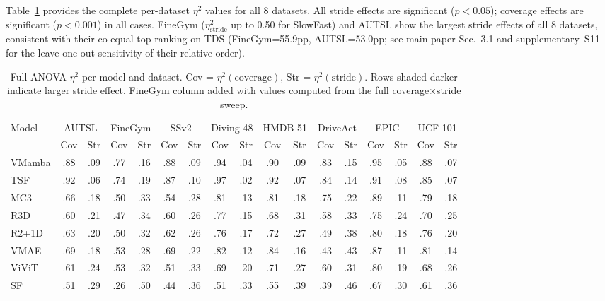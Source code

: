\documentclass[runningheads]{llncs}
\newcommand{\tabtight}{\setlength{\tabcolsep}{3.5pt}\renewcommand{\arraystretch}{1.12}}
\begin{document}
Table~\ref{tab:anova_full} provides the complete per-dataset $\eta^2$ values for all 8 datasets. All stride effects are significant ($p < 0.05$); coverage effects are significant ($p < 0.001$) in all cases. FineGym ($\eta^2_\text{stride}$ up to 0.50 for SlowFast) and AUTSL show the largest stride effects of all 8 datasets, consistent with their co-equal top ranking on TDS (FineGym=55.9pp, AUTSL=53.0pp; see main paper Sec.~3.1 and supplementary~S11 for the leave-one-out sensitivity of their relative order).

\begin{table}[!htbp]
\centering
\caption{Full ANOVA $\eta^2$ per model and dataset. Cov = $\eta^2(\text{coverage})$, Str = $\eta^2(\text{stride})$. Rows shaded darker indicate larger stride effect. FineGym column added with values computed from the full coverage$\times$stride sweep.}
\label{tab:anova_full}
\scriptsize\tabtight
\begin{adjustbox}{max width=\textwidth}
\begin{tabular}{l *{8}{cc}}
\toprule
\multirow{2}{*}{Model} & \multicolumn{2}{c}{AUTSL} & \multicolumn{2}{c}{FineGym} & \multicolumn{2}{c}{SSv2} & \multicolumn{2}{c}{Diving-48} & \multicolumn{2}{c}{HMDB-51} & \multicolumn{2}{c}{DriveAct} & \multicolumn{2}{c}{EPIC}
 & \multicolumn{2}{c}{UCF-101} \\
\cmidrule(lr){2-3}\cmidrule(lr){4-5}\cmidrule(lr){6-7}\cmidrule(lr){8-9} \cmidrule(lr){10-11}\cmidrule(lr){12-13}\cmidrule(lr){14-15}\cmidrule(lr){16-17} & Cov & Str & Cov & Str & Cov & Str & Cov & Str & Cov & Str & Cov & Str & Cov & Str
 & Cov & Str \\
\midrule
VMamba & .88 & .09 & .77 & .16 & .88 & .09 & .94 & .04 & .90 & .09 & .83 & .15 & .95 & .05 & .88 & .07 \\
TSF    & .92 & .06 & .74 & .19 & .87 & .10 & .97 & .02 & .92 & .07 & .84 & .14 & .91 & .08 & .85 & .07 \\
MC3    & .66 & .18 & .50 & .33 & .54 & .28 & .81 & .13 & .81 & .18 & .75 & .22 & .89 & .11 & .79 & .18 \\
R3D    & .60 & .21 & .47 & .34 & .60 & .26 & .77 & .15 & .68 & .31 & .58 & .33 & .75 & .24 & .70 & .25 \\
R2+1D  & .63 & .20 & .50 & .32 & .62 & .26 & .76 & .17 & .72 & .27 & .49 & .38 & .80 & .18 & .76 & .20 \\
VMAE   & .69 & .18 & .53 & .28 & .69 & .22 & .82 & .12 & .84 & .16 & .43 & .43 & .87 & .11 & .81 & .14 \\
ViViT  & .61 & .24 & .53 & .32 & .51 & .33 & .69 & .20 & .71 & .27 & .60 & .31 & .80 & .19 & .68 & .26 \\
SF     & .51 & .29 & .26 & .50 & .44 & .36 & .51 & .33 & .55 & .39 & .39 & .46 & .67 & .30 & .61 & .36 \\
\bottomrule
\end{tabular}
\end{adjustbox}
\end{table}
\end{document}

